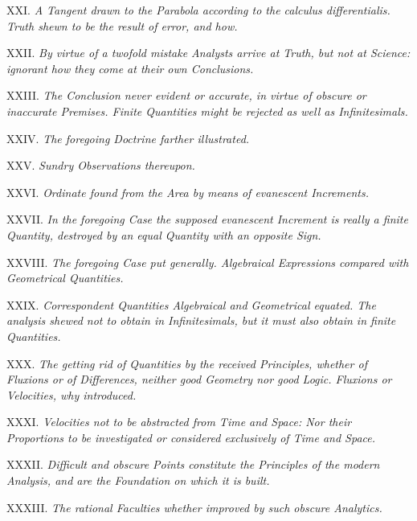 \item{XXI.}
{\it
A Tangent drawn to the Parabola according to the {\rm calculus
differentialis}.  Truth shewn to be the result of error, and
how.}

\item{XXII.}
{\it
By virtue of a twofold mistake Analysts arrive at Truth, but not
at Science: ignorant how they come at their own Conclusions.}

\item{XXIII.}
{\it
The Conclusion never evident or accurate, in virtue of obscure or
inaccurate Premises.  Finite Quantities might be rejected as well
as Infinitesimals.}

\item{XXIV.}
{\it
The foregoing Doctrine farther illustrated.}

\item{XXV.}
{\it
Sundry Observations thereupon.}

\item{XXVI.}
{\it
Ordinate found from the Area by means of evanescent Increments.}

\item{XXVII.}
{\it
In the foregoing Case the supposed evanescent Increment is really
a finite Quantity, destroyed by an equal Quantity with an
opposite Sign.}

\item{XXVIII.}
{\it
The foregoing Case put generally.  Algebraical Expressions
compared with Geometrical Quantities.}

\item{XXIX.}
{\it
Correspondent Quantities Algebraical and Geometrical equated.
The analysis shewed not to obtain in Infinitesimals, but it must
also obtain in finite Quantities.}

\item{XXX.}
{\it
The getting rid of Quantities by the received Principles, whether
of Fluxions or of Differences, neither good Geometry nor good
Logic.  Fluxions or Velocities, why introduced.}

\item{XXXI.}
{\it
Velocities not to be abstracted from Time and Space: Nor their
Proportions to be investigated or considered exclusively of Time
and Space.}

\item{XXXII.}
{\it
Difficult and obscure Points constitute the Principles of the
modern Analysis, and are the Foundation on which it is built.}

\item{XXXIII.}
{\it
The rational Faculties whether improved by such obscure
Analytics.}

